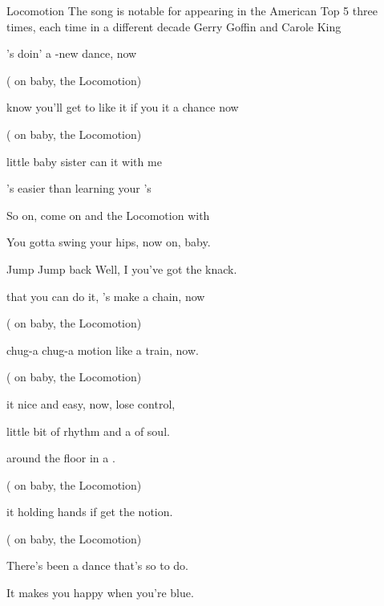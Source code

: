 \begin{SBSong}{Locomotion}
  {The song is notable for appearing in the American Top 5 three times, each time in a different decade}
  {Gerry Goffin and Carole King}
  \SBDirection{}
  \begin{SBVerse}
	's doin' a -new dance, now
	
	( on baby,  the Locomotion)
	
	 know you'll get to like it if you  it a chance now
	
	( on baby,  the Locomotion)
	
	 little baby sister can  it with me
	
	's easier than learning your 's
  \end{SBVerse}
  \begin{SBChorus}
	So  on, come on and  the Locomotion with 
	
	You gotta swing your hips, now  on, baby.
	
	Jump  Jump back Well, I  you've got the knack.
  \end{SBChorus}
  \begin{SBVerse}
	 that you can do it, 's make a chain, now
	
	( on baby,  the Locomotion)
	
	 chug-a chug-a motion like a  train, now.
	
	( on baby,  the Locomotion)
	
	 it nice and easy, now,  lose control,
	
	 little bit of rhythm and a  of soul.
  \end{SBVerse}
  \begin{SBVerse}
	 around the floor in a .
	
	( on baby,  the Locomotion)
	
	 it holding hands if  get the notion.
	
	( on baby,  the Locomotion)
	
	There's  been a dance that's so  to do.
	
	It  makes you happy when you're  blue.
  \end{SBVerse}
\end{SBSong}
